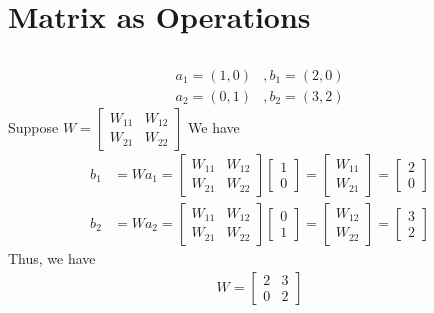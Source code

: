 \documentclass{article}
\begin{document}
\section{Matrix as Operations}\label{sec:Matrix as Operations} %
\subsection{}\label{sub:} %
\begin{align*}
    a_1 = (1, 0)&, b_1 = (2, 0)\\
    a_2 = (0, 1)&, b_2 = (3, 2)
\end{align*}
Suppose $ W = \begin{bmatrix}
    W_{11} & W_{12} \\ W_{21} & W_{22}
\end{bmatrix} $
We have
\begin{align*}
    b_1 &= Wa_1 = \begin{bmatrix}
        W_{11} & W_{12} \\ W_{21} & W_{22}
    \end{bmatrix}\begin{bmatrix}
    1 \\ 0 
    \end{bmatrix}=\begin{bmatrix}
    W_{11} \\ W_{21}
    \end{bmatrix} = \begin{bmatrix}
    2\\0
    \end{bmatrix}\\
    b_2 &= Wa_2 = \begin{bmatrix}
        W_{11 } & W_{12 } \\
        W_{21 } & W_{22}
    \end{bmatrix}\begin{bmatrix}
    0 \\1 
    \end{bmatrix} = \begin{bmatrix}
        W_{12} \\
        W_{22}
    \end{bmatrix} = \begin{bmatrix}
    3  \\ 2 
    \end{bmatrix}
\end{align*}
Thus, we have
\begin{align*}
    W = \begin{bmatrix}
    2 & 3 \\
    0 & 2
    \end{bmatrix}
\end{align*}
\end{document}
